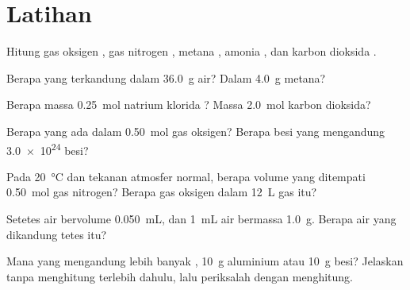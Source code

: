 \section{Latihan}

\begin{exercise}[$\star$]\label{exo:g10:the-mole:1}
Hitung  gas oksigen , gas nitrogen , metana
, amonia , dan karbon dioksida .
\end{exercise}

\begin{exercise}[$\star$]\label{exo:g10:the-mole:2}
Berapa  yang terkandung dalam \qty{36.0}{g} air? Dalam
\qty{4.0}{g} metana?
\end{exercise}

\begin{exercise}[$\star$]\label{exo:g10:the-mole:3}
Berapa massa \qty{0.25}{mol} natrium klorida ? Massa
\qty{2.0}{mol} karbon dioksida?
\end{exercise}

\begin{exercise}[$\star$]\label{exo:g10:the-mole:4}
Berapa  yang ada dalam \qty{0.50}{mol} gas oksigen? Berapa  besi yang mengandung \num{3.0e24}  besi?
\end{exercise}

\begin{exercise}[$\star$]\label{exo:g10:the-mole:5}
Pada \qty{20}{\celsius} dan tekanan atmosfer normal, berapa volume yang
ditempati \qty{0.50}{mol} gas nitrogen? Berapa  gas oksigen
dalam \qty{12}{L} gas itu?
\end{exercise}

\begin{exercise}[$\star\star$]\label{exo:g10:the-mole:6}
Setetes air bervolume \qty{0.050}{mL}, dan \qty{1}{mL} air bermassa
\qty{1.0}{g}. Berapa  air yang dikandung tetes itu?
\end{exercise}

\begin{exercise}[$\star\star$]\label{exo:g10:the-mole:7}
Mana yang mengandung lebih banyak , \qty{10}{g} aluminium atau
\qty{10}{g} besi? Jelaskan tanpa menghitung terlebih dahulu, lalu
periksalah dengan menghitung.
\end{exercise}

